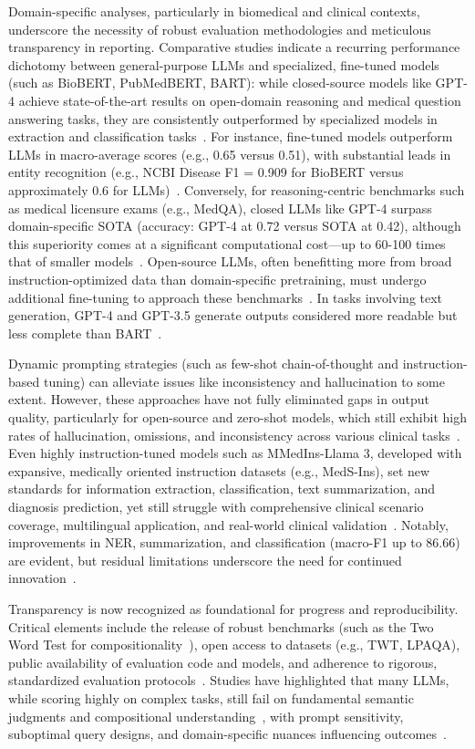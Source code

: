 \documentclass[sigconf]{acmart}
\begin{document}
Domain-specific analyses, particularly in biomedical and clinical contexts, underscore the necessity of robust evaluation methodologies and meticulous transparency in reporting. Comparative studies indicate a recurring performance dichotomy between general-purpose LLMs and specialized, fine-tuned models (such as BioBERT, PubMedBERT, BART): while closed-source models like GPT-4 achieve state-of-the-art results on open-domain reasoning and medical question answering tasks, they are consistently outperformed by specialized models in extraction and classification tasks~\cite{ref94,ref95}. For instance, fine-tuned models outperform LLMs in macro-average scores (e.g., 0.65 versus 0.51), with substantial leads in entity recognition (e.g., NCBI Disease F1 = 0.909 for BioBERT versus approximately 0.6 for LLMs)~\cite{ref94}. Conversely, for reasoning-centric benchmarks such as medical licensure exams (e.g., MedQA), closed LLMs like GPT-4 surpass domain-specific SOTA (accuracy: GPT-4 at 0.72 versus SOTA at 0.42), although this superiority comes at a significant computational cost—up to 60-100 times that of smaller models~\cite{ref94}. Open-source LLMs, often benefitting more from broad instruction-optimized data than domain-specific pretraining, must undergo additional fine-tuning to approach these benchmarks~\cite{ref94}. In tasks involving text generation, GPT-4 and GPT-3.5 generate outputs considered more readable but less complete than BART~\cite{ref94}.

Dynamic prompting strategies (such as few-shot chain-of-thought and instruction-based tuning) can alleviate issues like inconsistency and hallucination to some extent. However, these approaches have not fully eliminated gaps in output quality, particularly for open-source and zero-shot models, which still exhibit high rates of hallucination, omissions, and inconsistency across various clinical tasks~\cite{ref94}. Even highly instruction-tuned models such as MMedIns-Llama 3, developed with expansive, medically oriented instruction datasets (e.g., MedS-Ins), set new standards for information extraction, classification, text summarization, and diagnosis prediction, yet still struggle with comprehensive clinical scenario coverage, multilingual application, and real-world clinical validation~\cite{ref95}. Notably, improvements in NER, summarization, and classification (macro-F1 up to 86.66) are evident, but residual limitations underscore the need for continued innovation~\cite{ref95}.

Transparency is now recognized as foundational for progress and reproducibility. Critical elements include the release of robust benchmarks (such as the Two Word Test for compositionality~\cite{ref96}), open access to datasets (e.g., TWT, LPAQA), public availability of evaluation code and models, and adherence to rigorous, standardized evaluation protocols~\cite{ref94,ref95,ref96,ref98}. Studies have highlighted that many LLMs, while scoring highly on complex tasks, still fail on fundamental semantic judgments and compositional understanding~\cite{ref96}, with prompt sensitivity, suboptimal query designs, and domain-specific nuances influencing outcomes~\cite{ref98}.
\end{document}
